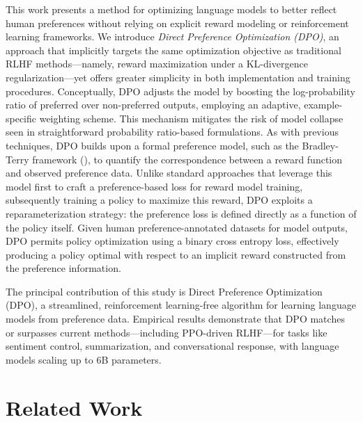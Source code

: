This work presents a method for optimizing language models to better reflect human preferences without relying on explicit reward modeling or reinforcement learning frameworks. We introduce \textit{{Direct Preference Optimization} (DPO)}, an approach that implicitly targets the same optimization objective as traditional RLHF methods—namely, reward maximization under a KL-divergence regularization—yet offers greater simplicity in both implementation and training procedures. Conceptually, DPO adjusts the model by boosting the log-probability ratio of preferred over non-preferred outputs, employing an adaptive, example-specific weighting scheme. This mechanism mitigates the risk of model collapse seen in straightforward probability ratio-based formulations. As with previous techniques, DPO builds upon a formal preference model, such as the Bradley-Terry framework (\cite{bradley1952rankanalysis}), to quantify the correspondence between a reward function and observed preference data. Unlike standard approaches that leverage this model first to craft a preference-based loss for reward model training, subsequently training a policy to maximize this reward, DPO exploits a reparameterization strategy: the preference loss is defined directly as a function of the policy itself. Given human preference-annotated datasets for model outputs, DPO permits policy optimization using a binary cross entropy loss, effectively producing a policy optimal with respect to an implicit reward constructed from the preference information.

The principal contribution of this study is Direct Preference Optimization (DPO), a streamlined, reinforcement learning-free algorithm for learning language models from preference data. Empirical results demonstrate that DPO matches or surpasses current methods—including PPO-driven RLHF—for tasks like sentiment control, summarization, and conversational response, with language models scaling up to 6B parameters.

\section{Related Work}

